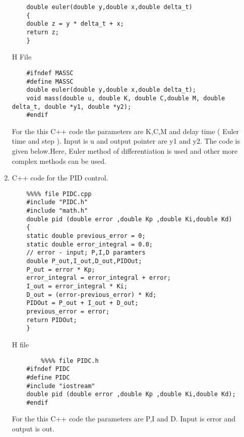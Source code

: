 \documentclass{article}
\begin{document}
\begin{enumerate}
\begin{verbatim}
    double euler(double y,double x,double delta_t)
    {
    double z = y * delta_t + x;
    return z;
    }
    \end{verbatim}
    H File
    \begin{verbatim}
    #ifndef MASSC
    #define MASSC
    double euler(double y,double x,double delta_t);
    void mass(double u, double K, double C,double M, double delta_t, double *y1, double *y2);
    #endif
    \end{verbatim}
    For the this C++ code the parameters are K,C,M and delay time ( Euler time and step ). Input is u and output pointer are y1 and y2. The code is given below.Here, Euler method of differentiation is used and other more complex methods can be used.\\
    \item C++ code for the PID control. 
    \begin{verbatim}
    %%%% file PIDC.cpp
    #include "PIDC.h"
    #include "math.h"
    double pid (double error ,double Kp ,double Ki,double Kd)
    {
    static double previous_error = 0;
    static double error_integral = 0.0;
    // error - input; P,I,D paramters
    double P_out,I_out,D_out,PIDOut;
    P_out = error * Kp;
    error_integral = error_integral + error;
    I_out = error_integral * Ki;
    D_out = (error-previous_error) * Kd;
    PIDOut = P_out + I_out + D_out;
    previous_error = error;
    return PIDOut;
    }
    \end{verbatim}
    H file
    \begin{verbatim}
        %%%% file PIDC.h
    #ifndef PIDC
    #define PIDC
    #include "iostream"
    double pid (double error ,double Kp ,double Ki,double Kd);
    #endif
    \end{verbatim}
    For the this C++ code the parameters are P,I and D. Input is error and output is out.
    

\end{enumerate}
\end{document}
